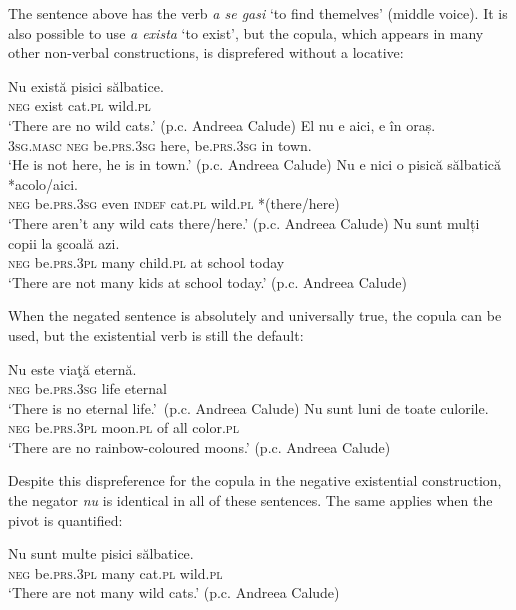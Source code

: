 ﻿\documentclass[output=paper]{langsci/langscibook}
\begin{document}
\begin{unindented}
The sentence above has the verb \textit{a se gasi} `to find themelves' (middle voice). It is also possible to use \textit{a exista} `to exist', but the copula, which appears in many other non-verbal constructions, is disprefered without a locative:
%
\begin{exe}\ex \gll Nu există pisici sălbatice. \\
\textsc{neg} exist cat.\textsc{pl} wild.\textsc{pl} \\
    \glt `There are no wild cats.' (p.c. Andreea Calude)
\ex \gll El nu e aici, e în oraș.  \\
\textsc{3sg.masc} \textsc{neg} be.\textsc{prs}.\textsc{3sg} here,          be.\textsc{prs.3sg} in town.  \\
    \glt `He is not here, he is in town.' (p.c. Andreea Calude)
\ex \gll Nu e nici o pisică sălbatică *{\op}acolo/aici{\cp}. \\
\textsc{neg} be.\textsc{prs}.\textsc{3sg} even \textsc{indef} cat.\textsc{pl}  wild.\textsc{pl} *(there/here) \\
    \glt `There aren't any wild cats there/here.' (p.c. Andreea Calude)
\ex \gll Nu sunt mulți copii la şcoală azi.  \\
\textsc{neg} be.\textsc{prs.3pl} many child.\textsc{pl} at school today \\
    \glt `There are not many kids at school today.' (p.c. Andreea Calude)
    \end{exe}

When the negated sentence is absolutely and universally true, the copula can be used, but the existential verb is still the default:
%
\begin{exe}\ex \gll Nu este viaţă eternă.  \\
\textsc{neg} be.\textsc{prs.3sg} life eternal \\
    \glt `There is no eternal life.'~(p.c. Andreea Calude)
\ex \gll Nu sunt luni de toate culorile.  \\
\textsc{neg} be.\textsc{prs.3pl} moon.\textsc{pl} of all color.\textsc{pl} \\
    \glt `There are no rainbow-coloured moons.' (p.c. Andreea Calude)
    \end{exe}

Despite this dispreference for the copula in the negative existential construction, the negator \textit{nu} is identical in all of these sentences. The same applies when the pivot is quantified:
%
\begin{exe}\ex \gll Nu sunt multe pisici sălbatice. \\
\textsc{neg} be.\textsc{prs.3pl} many cat.\textsc{pl} wild.\textsc{pl} \\
    \glt `There are not many wild cats.' (p.c. Andreea Calude)
    \end{exe}


\end{unindented}
\end{document}
